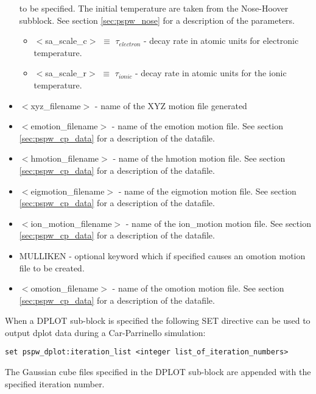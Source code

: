 \begin{itemize}
                         to be specified.  The initial temperature are taken from the
                         Nose-Hoover subblock.
                         See section \ref{sec:pspw_nose} for a description of the parameters.
                         \begin{itemize}
                             \item $<$sa\_scale\_c$>$ $\equiv$ $\tau_{electron}$ 
                                    - decay rate in atomic units for electronic temperature.
                             \item $<$sa\_scale\_r$>$ $\equiv$ $\tau_{ionic}$ 
                                    - decay rate in atomic units for the ionic temperature.
                         \end{itemize}

        \item $<$xyz\_filename$>$ - name of the XYZ motion file
                                generated
        \item $<$emotion\_filename$>$ - name of the emotion motion file.
                                See section \ref{sec:pspw_cp_data} for a 
                                description of the datafile.
        \item $<$hmotion\_filename$>$ - name of the hmotion motion file.
                                See section \ref{sec:pspw_cp_data} for a 
                                description of the datafile.
        \item $<$eigmotion\_filename$>$ - name of the eigmotion motion file.
                                See section \ref{sec:pspw_cp_data} for a 
                                description of the datafile.
       \item $<$ion\_motion\_filename$>$ - name of the ion\_motion motion file.
                                See section \ref{sec:pspw_cp_data} for a 
                                description of the datafile.
       \item MULLIKEN - optional keyword which if specified causes an omotion motion file to be created. 
        \item $<$omotion\_filename$>$ - name of the omotion motion file.
                                See section \ref{sec:pspw_cp_data} for a 
                                description of the datafile.
\end{itemize}

When a DPLOT sub-block is specified the following SET directive can be used 
to output dplot data during a Car-Parrinello simulation:
\begin{verbatim}
set pspw_dplot:iteration_list <integer list_of_iteration_numbers>
\end{verbatim}
The Gaussian cube files specified in the DPLOT sub-block are appended
with the specified iteration number. 

